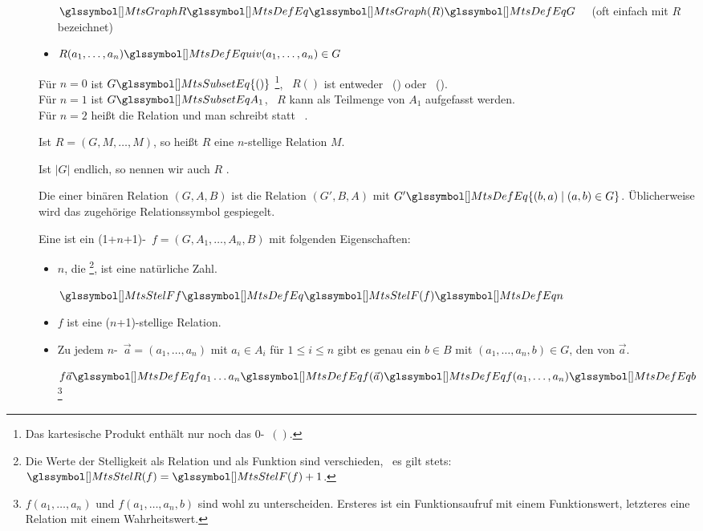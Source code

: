 \begin{description}
\begin{itemize}
		$\MtsGraph R \MtsDefEq \MtsGraph(R) \MtsDefEq G \quad$ (oft einfach mit $R$ bezeichnet)
		\item $R(a_1,\dots,a_n) \MtsDefEquiv (a_1,\dots,a_n) \in G$
	\end{itemize}
	Für $n=0$ ist $G \MtsSubsetEq \{()\}$%
	\footnote{%
		Das kartesische Produkt enthält nur noch das $0$-\Tupel\ $()$.
	},
	\textdh\ $R()$ ist entweder \TxtTrue\ (\MtsTrue) oder \TxtFalse\ (\MtsFalse).
	\\Für $n=1$ ist $G \MtsSubsetEq A_1$, \textdh\ $R$ kann als Teilmenge von $A_1$ aufgefasst werden.
	\\Für $n=2$ heißt die Relation  und man schreibt  statt  \textbzw\ .

	Ist $R=(G,M,\dots,M)$, so heißt $R$ eine $n$-stellige Relation  $M$.

	Ist $|G|$ endlich, so nennen wir auch $R$ .

	\item [\Umkehrrelation] Die  einer binären Relation $(G,A,B)$ ist die Relation $(G',B,A)$ mit $G' \MtsDefEq \{(b,a)\mid(a,b) \in G\}$.
	Üblicherweise wird das zugehörige Relationssymbol gespiegelt.

	\item [\Funktion] Eine  ist ein (1+$n$+1)-\Tupel\ $f = (G,A_1,\dots,A_n,B)$ mit folgenden Eigenschaften:
	\begin{itemize}
		\item $n$, die %
		\footnote{%
			Die Werte der Stelligkeit als Relation und als Funktion sind verschieden, \textdh\ es gilt stets: $\MtsStelR(f) = \MtsStelF(f) + 1$.
		},
		ist eine natürliche Zahl.

		$\MtsStelF f \MtsDefEq \MtsStelF(f) \MtsDefEq n$

		\item $f$ ist eine ($n$+1)-stellige Relation.

		\item Zu jedem $n$-\Tupel\ $\vec{a} = (a_1,\dots,a_n)$ mit $a_i \in A_i$ für $1 \le i \le n$ gibt es genau ein $b \in B$ mit $(a_1,\dots,a_n,b) \in G$, den  von $\vec{a}$.

		$f\vec{a} \MtsDefEq f a_1 \dots a_n \MtsDefEq f(\vec{a}) \MtsDefEq f(a_1,\dots,a_n) \MtsDefEq b$
		\footnote{%
			$f(a_1,\dots,a_n)$ und $f(a_1,\dots,a_n,b)$ sind wohl zu unterscheiden.
			Ersteres ist ein Funktionsaufruf mit einem Funktionswert, letzteres eine Relation mit einem Wahrheitswert.
		}


\end{itemize}
\end{description}
